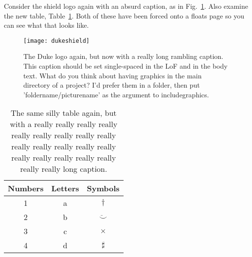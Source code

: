 Consider the shield logo again with an absurd caption, as in
Fig.~\ref{fig:shield}.
Also examine the new table, Table~\ref{tab:long-caption}.  Both of these
have been forced onto a floats page so you can see what that looks like.
\begin{figure}[p]
	\begin{center}
	\texttt{[image: dukeshield]}
	\end{center}
	\caption{The Duke logo again, but now with a really long rambling
	caption.  This caption should be set single-spaced in the LoF and in the
	body text.  What do you think about having graphics in the main directory
	of a project?  I'd prefer them in a folder, then put
	'foldername/picturename' as the argument to includegraphics.}
	\label{fig:shield}
\end{figure}
\begin{table}[p]
\caption{The same silly table again, but with a really really really
	really really really
	really really really
	really really really
	really really really
	really really really
	really really really
	long caption.}
	\label{tab:long-caption}
	\begin{center}
		\begin{tabular}{c|c|c}
			\hline
			Numbers & Letters & Symbols \\ \hline
			1 & a & $\dagger$ \\
			2 & b & $\ddot \smile$ \\
			3 & c & $\times$ \\
			4 & d & $\sharp$ \\
		\end{tabular}
	\end{center}
\end{table}

